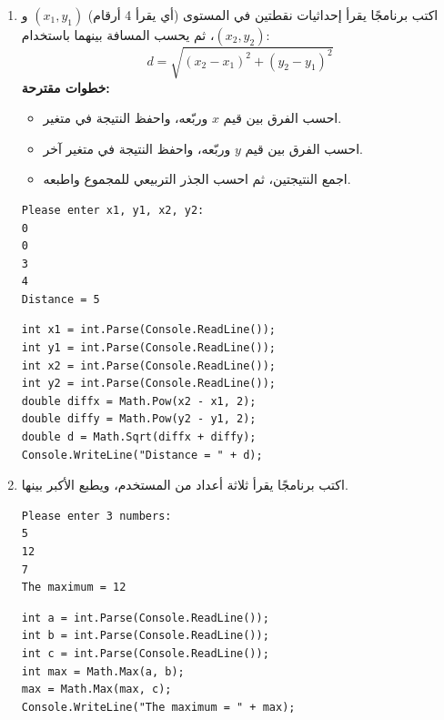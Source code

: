 \documentclass[14pt]{extarticle}
\begin{document}
\begin{enumerate}[itemsep=3em]
    \item
    اكتب برنامجًا يقرأ إحداثيات نقطتين في المستوى (أي يقرأ 4 أرقام) $(x_1, y_1)$ و $(x_2, y_2)$، ثم يحسب المسافة بينهما باستخدام:
    $$d = \sqrt{(x_2 - x_1)^2 + (y_2 - y_1)^2}$$
    \textbf{خطوات مقترحة:}
    \begin{itemize}
        \item احسب الفرق بين قيم $x$ وربّعه، واحفظ النتيجة في متغير.
        \item احسب الفرق بين قيم $y$ وربّعه، واحفظ النتيجة في متغير آخر.
        \item اجمع النتيجتين، ثم احسب الجذر التربيعي للمجموع واطبعه.
    \end{itemize}
    \ifdetailed
    \begin{boxExample}
    \begin{english}
    \begin{verbatim}
Please enter x1, y1, x2, y2:
0
0
3
4
Distance = 5
    \end{verbatim}
    \end{english}
    \end{boxExample}
    \ifwithsols
    \begin{boxSolution}
    \begin{english}
    \begin{verbatim}
int x1 = int.Parse(Console.ReadLine());
int y1 = int.Parse(Console.ReadLine());
int x2 = int.Parse(Console.ReadLine());
int y2 = int.Parse(Console.ReadLine());
double diffx = Math.Pow(x2 - x1, 2);
double diffy = Math.Pow(y2 - y1, 2);
double d = Math.Sqrt(diffx + diffy);
Console.WriteLine("Distance = " + d);
    \end{verbatim}
    \end{english}
    \end{boxSolution}
    \fi
    \clearpage
\fi

    \item
    اكتب برنامجًا يقرأ ثلاثة أعداد من المستخدم، ويطبع الأكبر بينها.
    \ifdetailed
    \begin{boxExample}
    \begin{english}
    \begin{verbatim}
Please enter 3 numbers:
5
12
7
The maximum = 12
    \end{verbatim}
    \end{english}
    \end{boxExample}
    \ifwithsols
    \begin{boxSolution}
    \begin{english}
    \begin{verbatim}
int a = int.Parse(Console.ReadLine());
int b = int.Parse(Console.ReadLine());
int c = int.Parse(Console.ReadLine());
int max = Math.Max(a, b);
max = Math.Max(max, c);
Console.WriteLine("The maximum = " + max);
    \end{verbatim}
    \end{english}
    \end{boxSolution}
    \clearpage
    \fi
\fi


\end{enumerate}
\end{document}
